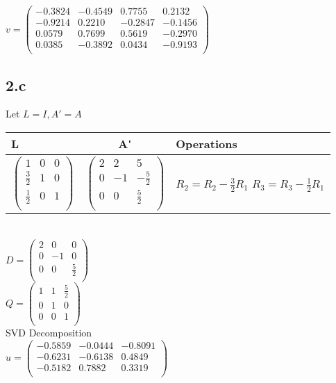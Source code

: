 \documentclass{article}
\begin{document}
$v =
\begin{pmatrix}
   -0.3824  & -0.4549  &  0.7755  &  0.2132 \\
   -0.9214  &  0.2210  & -0.2847  & -0.1456 \\
    0.0579  &  0.7699  &  0.5619  & -0.2970 \\
    0.0385  & -0.3892  &  0.0434  & -0.9193 \\
 \end{pmatrix}$

\subsection*{2.c}
Let $ L = I, A' = A$ \\
\begin{tabular}{|l|c|p{5cm}|}
\hline
\textbf{L} & \textbf{A\'} & \textbf{Operations}\\
\hline
$\begin{pmatrix}
    1 & 0 & 0 \\
    \frac{3}{2} & 1 & 0 \\
    \frac{1}{2} & 0 & 1 \\
\end{pmatrix}$
&
$\begin{pmatrix}
    2 & 2 & 5 \\
    0 & -1 & -\frac{5}{2} \\
    0 & 0 & \frac{5}{2} \\
\end{pmatrix}$
&
$R_2 = R_2 - \frac{3}{2} R_1 $ \newline
$R_3 = R_3 - \frac{1}{2} R_1$ \\
\hline
\end{tabular} \\
$D = 
\begin{pmatrix}
    2 & 0 & 0 \\
    0 & -1 & 0 \\
    0 & 0 & \frac{5}{2} \\
\end{pmatrix}
$ \\
$
Q = 
\begin{pmatrix}
    1 & 1 & \frac{5}{2} \\
    0 & 1 & 0 \\
    0 & 0 & 1 \\
\end{pmatrix}
$ \\
SVD Decomposition\\
$
u =
\begin{pmatrix}
   -0.5859  & -0.0444 &  -0.8091 \\
   -0.6231  & -0.6138 &   0.4849 \\
   -0.5182  &  0.7882 &   0.3319 \\
\end{pmatrix}$\\
\end{document}
